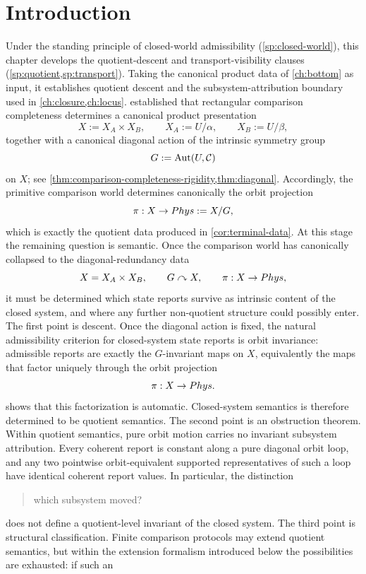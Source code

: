 \section{Introduction}
Under the standing principle of closed-world admissibility
(\cref{sp:closed-world}), this chapter develops the
quotient-descent and transport-visibility clauses
(\cref{sp:quotient,sp:transport}).
Taking the canonical product data of \cref{ch:bottom} as input, it
establishes quotient descent and the subsystem-attribution boundary used
in \cref{ch:closure,ch:locus}.
 established that rectangular comparison completeness
determines a canonical product presentation
\[
	X:=X_A\times X_B,
	\qquad
	X_A:=U/\alpha,
	\qquad
	X_B:=U/\beta,
\]
together with a canonical diagonal action of the intrinsic symmetry group
\[
	G:=\operatorname{Aut}(U,\mathcal C)
\]
on \(X\); see \cref{thm:comparison-completeness-rigidity,thm:diagonal}.
Accordingly, the primitive comparison world determines canonically the
orbit projection
\[
	\pi:X\to Phys:=X/G,
\]
which is exactly the quotient data produced in
\cref{cor:terminal-data}.
At this stage the remaining question is semantic. Once the comparison
world has canonically collapsed to the diagonal-redundancy data
\[
	X=X_A\times X_B,
	\qquad
	G\curvearrowright X,
	\qquad
	\pi:X\to Phys,
\]
it must be determined which state reports survive as intrinsic content
of the closed system, and where any further non-quotient structure could
possibly enter.
The first point is descent. Once the diagonal action is fixed, the
natural admissibility criterion for closed-system state reports is orbit
invariance: admissible reports are exactly the \(G\)-invariant maps on
\(X\), equivalently the maps that factor uniquely through the orbit
projection
\[
	\pi:X\to Phys.
\]
 shows that this factorization is automatic.
Closed-system semantics is therefore determined to be quotient semantics.
The second point is an obstruction theorem. Within quotient semantics,
pure orbit motion carries no invariant subsystem attribution. Every
coherent report is constant along a pure diagonal orbit loop, and any
two pointwise orbit-equivalent supported representatives of such a loop
have identical coherent report values. In particular, the distinction
\begin{quote}
	which subsystem moved?
\end{quote}
does not define a quotient-level invariant of the closed system.
The third point is structural classification. Finite comparison
protocols may extend quotient semantics, but within the extension
formalism introduced below the possibilities are exhausted: if such an
